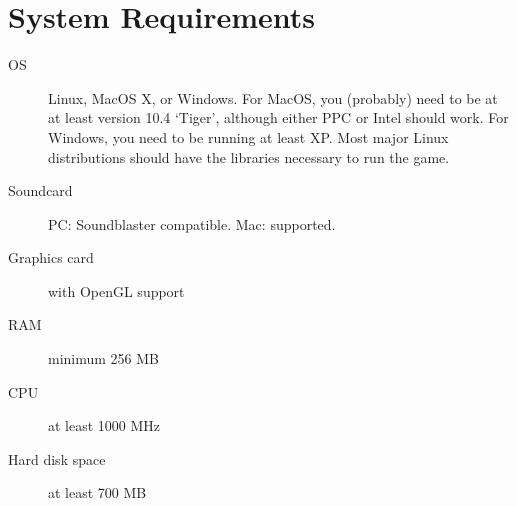 \section{System Requirements}

\begin{description}
\item[OS] Linux, MacOS X, or Windows.  For MacOS, you (probably) need to be at at least version 10.4 `Tiger', although either PPC or Intel should work.  For Windows, you need to be running at least XP.  Most major Linux distributions should have the libraries necessary to run the game.
\item[Soundcard] PC: Soundblaster compatible.  Mac: supported.
\item[Graphics card] with OpenGL support
\item[RAM] minimum 256 MB
\item[CPU] at least 1000 MHz
\item[Hard disk space] at least 700 MB
\end{description}

